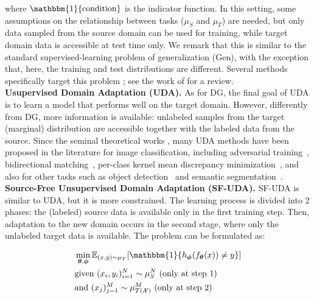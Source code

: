 \documentclass{article}
\begin{document}
where $\mathbbm{1}\{\text{condition}\}$ is the indicator function. 
In this setting, some assumptions on the relationship between tasks ($\mu_S$ and $\mu_T$) are needed, but only data sampled from the source domain can be used for training, while target domain data is accessible at test time only. 
We remark that this is similar to the standard supervised-learning problem of generalization (Gen), with the exception that, here, the training and test distributions are different. 
Several methods specifically target this problem \citep{volpi2018generalizing, arjovsky2019invariant, ilse2020diva}; see the work of \cite{ijcai2021-628} for a review.\\
\textbf{Usupervised Domain Adaptation (UDA).} As for DG, the final goal of UDA is to learn a model that performs well on the target domain. However, differently from DG, more information is available: unlabeled samples from the target (marginal) distribution are accessible together with the labeled data from the source. 
Since the seminal theoretical works \cite{ben2006analysis, ben2010theory, mansour2009domain}, many UDA methods have been proposed in the literature for image classification, including adversarial training~\citep{ganin2016domain}, bidirectional matching~\citep{na2021fixbi}, per-class kernel mean discrepancy minimization~\citep{kang2019contrastive}, and also for other tasks such as object detection~\citep{oza2021unsupervised} and semantic segmentation~\citep{toldo2020unsupervised}.\\
\textbf{Source-Free Unsupervised Domain Adaptation (SF-UDA).} SF-UDA is similar to UDA, but it is more constrained.
The learning process is divided into 2 phases: the (labeled) source data is available only in the first training step.
Then, adaptation to the new domain occurs in the second stage, where only the unlabeled target data is available. The problem can be formulated as:

\begin{align}
& \min_{\bm{\theta}, \bm{\phi}} \mathbb{E}_{(x, y) \sim \mu_T}[\mathbbm{1}\{h_{\bm{\phi}}(f_{\bm{\theta}}(x)) \neq y\}] \\
& \text{given } (x_i, y_i)_{i=1}^N \sim \mu_S^N \text{ (only at step 1)} \\
& \text{and } (x_j)_{j=1}^M \sim \mu_{T(\mathcal{X})}^M \text{ (only at step 2)} 
\end{align}
\end{document}
